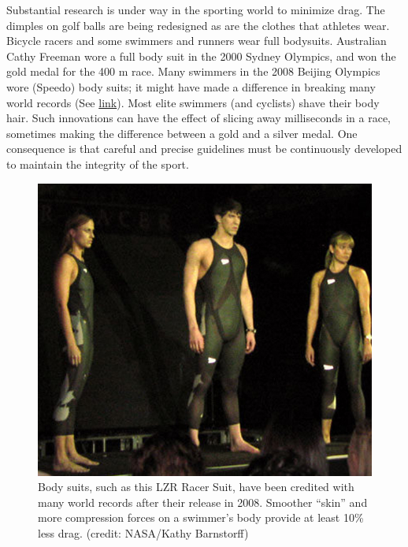 \documentclass[
]{book}
\begin{document}
Substantial research is under way in the sporting world to minimize
drag. The dimples on golf balls are being redesigned as are the clothes
that athletes wear. Bicycle racers and some swimmers and runners wear
full bodysuits. Australian Cathy Freeman wore a full body suit in the
2000 Sydney Olympics, and won the gold medal for the 400 m race. Many
swimmers in the 2008 Beijing Olympics wore (Speedo) body suits; it might
have made a difference in breaking many world records (See
\protect\hyperlink{import-auto-id1165298678773}{link}). Most
elite swimmers (and cyclists) shave their body hair. Such innovations
can have the effect of slicing away milliseconds in a race, sometimes
making the difference between a gold and a silver medal. One consequence
is that careful and precise guidelines must be continuously developed to
maintain the integrity of the sport.

\begin{figure}
\hypertarget{import-auto-id1165298678773}{%
\centering
\includegraphics{images/Figure_06_02_05a.jpg}
\caption{Body suits, such as this LZR Racer Suit, have been credited with many
world records after their release in 2008. Smoother ``skin'' and more
compression forces on a swimmer's body provide at least 10\% less drag.
(credit: NASA/Kathy
Barnstorff)}\label{import-auto-id1165298678773}
}
\end{figure}
\end{document}

